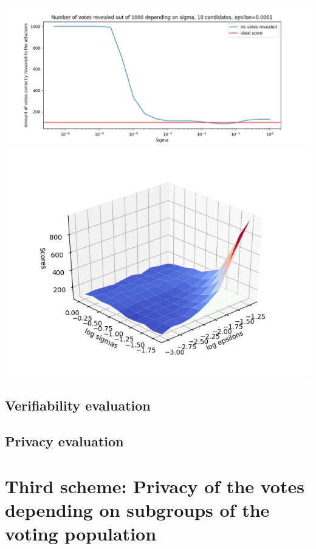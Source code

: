 \documentclass{article}
\begin{document}
\includegraphics[scale=0.5]{distribution_proba/influence_sigma.png}
\includegraphics[scale=0.8]{distribution_proba/influence_sigma_epsilon.png}

\subsection{Verifiability evaluation}



\subsection{Privacy evaluation}


\section{Third scheme: Privacy of the votes depending on subgroups of the voting population}
\end{document}
